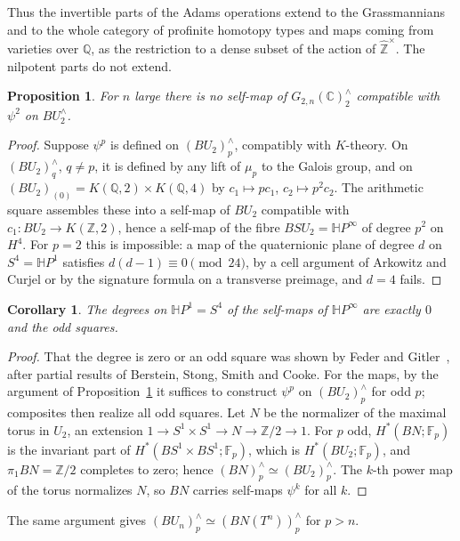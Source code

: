 \documentclass[11pt]{amsart}
\theoremstyle{plain}
\newtheorem{proposition}[theorem]{Proposition}
\newtheorem{corollary}[theorem]{Corollary}
\theoremstyle{definition}
\numberwithin{equation}{section}
\newcommand{\Z}{\mathbb{Z}}
\newcommand{\Q}{\mathbb{Q}}
\newcommand{\C}{\mathbb{C}}
\newcommand{\F}{\mathbb{F}}
\newcommand{\Zhat}{\widehat{\mathbb{Z}}}
\newcommand{\HP}{\mathbb{H}P}
\newcommand{\units}{^{\times}}
\begin{document}
Thus the invertible parts of the Adams operations extend to the Grassmannians and to the whole category of profinite homotopy types and maps coming from varieties over $\Q$, as the restriction to a dense subset of the action of $\Zhat\units$.
The nilpotent parts do not extend.

\begin{proposition}\label{prop:nopsi2}
For $n$ large there is no self-map of $G_{2,n}(\C)^\wedge_2$ compatible with $\psi^2$ on $BU^\wedge_2$.
\end{proposition}

\begin{proof}
Suppose $\psi^p$ is defined on $(BU_2)^\wedge_p$, compatibly with $K$-theory.
On $(BU_2)^\wedge_q$, $q\ne p$, it is defined by any lift of $\mu_p$ to the Galois group, and on $(BU_2)_{(0)}=K(\Q,2)\times K(\Q,4)$ by $c_1\mapsto pc_1$, $c_2\mapsto p^2c_2$.
The arithmetic square assembles these into a self-map of $BU_2$ compatible with $c_1\colon BU_2\to K(\Z,2)$, hence a self-map of the fibre $BSU_2=\HP^\infty$ of degree $p^2$ on $H^4$.
For $p=2$ this is impossible: a map of the quaternionic plane of degree $d$ on $S^4=\HP^1$ satisfies $d(d-1)\equiv0\pmod{24}$, by a cell argument of Arkowitz and Curjel or by the signature formula on a transverse preimage, and $d=4$ fails.
\end{proof}

\begin{corollary}\label{cor:HP}
The degrees on $\HP^1=S^4$ of the self-maps of $\HP^\infty$ are exactly $0$ and the odd squares.
\end{corollary}

\begin{proof}
That the degree is zero or an odd square was shown by Feder and Gitler~\cite{FederGitler}, after partial results of Berstein, Stong, Smith and Cooke.
For the maps, by the argument of Proposition~\ref{prop:nopsi2} it suffices to construct $\psi^p$ on $(BU_2)^\wedge_p$ for odd $p$; composites then realize all odd squares.
Let $N$ be the normalizer of the maximal torus in $U_2$, an extension $1\to S^1\times S^1\to N\to\Z/2\to1$.
For $p$ odd, $H^*(BN;\F_p)$ is the invariant part of $H^*(BS^1\times BS^1;\F_p)$, which is $H^*(BU_2;\F_p)$, and $\pi_1BN=\Z/2$ completes to zero; hence $(BN)^\wedge_p\simeq(BU_2)^\wedge_p$.
The $k$-th power map of the torus normalizes $N$, so $BN$ carries self-maps $\psi^k$ for all $k$.
\end{proof}

The same argument gives $(BU_n)^\wedge_p\simeq(BN(T^n))^\wedge_p$ for $p>n$.
\end{document}
